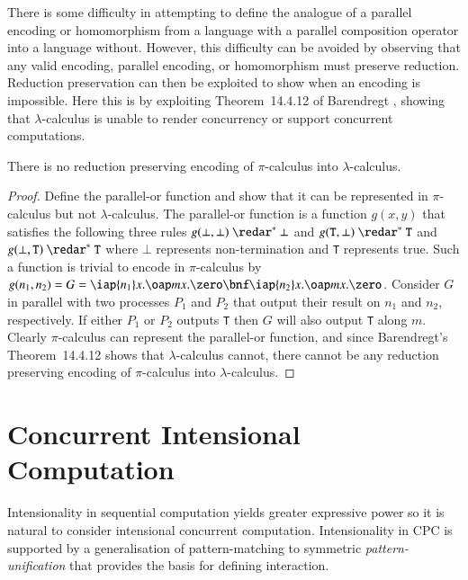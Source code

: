 \documentclass{llncs}
\renewcommand{\rew}{\redar}
\begin{document}
There is some difficulty in attempting to define the analogue of a parallel encoding or
homomorphism from a language with a parallel composition operator into a language without.
However, this difficulty can be avoided by observing that any valid encoding, parallel
encoding, or homomorphism must preserve reduction.
Reduction preservation can then be exploited to show when an encoding is impossible.
Here this is by exploiting Theorem~14.4.12 of Barendregt \cite{Barendregt85}, showing that
$\lambda$-calculus is unable to render concurrency or support concurrent computations.


\begin{theorem}
\label{thm:no-pi2lambda}
There is no reduction preserving encoding of $\pi$-calculus into $\lambda$-calculus.
\end{theorem}
\begin{proof}
Define the parallel-or function and show that it can be represented in $\pi$-calculus
but not $\lambda$-calculus.
The parallel-or function is a function $g(x,y)$ that satisfies the following three rules
$g(\bot,\bot) \ \rew^*\ \bot$ and 
$g({\texttt T},\bot) \ \rew^*\ {\texttt T}$ and
$g(\bot,{\texttt T}) \ \rew^*\ {\texttt T}$
where $\bot$ represents non-termination and {\texttt T} represents true.
Such a function is trivial to encode in $\pi$-calculus by
$g(n_1,n_2)= G = \iap {n_1} x.\oap m x.\zero\bnf \iap {n_2} x.\oap m x.\zero$.
Consider $G$ in parallel with two processes $P_1$ and $P_2$ that output their result on $n_1$
and $n_2$, respectively.
If either $P_1$ or $P_2$ outputs {\texttt T} then $G$ will also output {\texttt T} along $m$.
Clearly $\pi$-calculus can represent the parallel-or function, and since Barendregt's
Theorem~14.4.12 shows that $\lambda$-calculus cannot, there cannot be any reduction preserving
encoding of $\pi$-calculus into $\lambda$-calculus.
\end{proof}



\section{Concurrent Intensional Computation}
\label{sec:cic}

Intensionality in sequential computation yields greater expressive power so it is natural to consider intensional concurrent computation.
Intensionality in CPC is supported by a generalisation of pattern-matching to symmetric {\em pattern-unification} that provides the basis for defining interaction.
\end{document}
